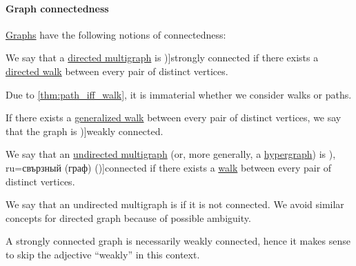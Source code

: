 \paragraph{Graph connectedness}

\begin{definition}\label{def:graph_connectedness}
  \hyperref[rem:graph_of_unspecified_type]{Graphs} have the following notions of connectedness:
  \begin{thmenum}
     We say that a \hyperref[def:directed_multigraph]{directed multigraph} is \term[ru=сильно связаный (граф) (\cite[def. 5.2]{БелоусовТкачёв2004ДискретнаяМатематика})]{strongly connected} if there exists a \hyperref[def:graph_walk/directed]{directed walk} between every pair of distinct vertices.

    Due to \cref{thm:path_iff_walk}, it is immaterial whether we consider walks or paths.

     If there exists a \hyperref[def:graph_walk/generalized]{generalized walk} between every pair of distinct vertices, we say that the graph is \term[ru=слабо связный (граф) (\cite[def. 5.4]{БелоусовТкачёв2004ДискретнаяМатематика})]{weakly connected}.

     We say that an \hyperref[def:hypergraph/multigraph]{undirected multigraph} (or, more generally, a \hyperref[def:hypergraph]{hypergraph}) is \term[bg=свързан (граф) (\cite[13]{Мирчев2001Графи}), ru=свързный (граф) (\cite[285]{БелоусовТкачёв2004ДискретнаяМатематика})]{connected} if there exists a \hyperref[def:graph_walk/undirected]{walk} between every pair of distinct vertices.

    We say that an undirected multigraph is  if it is not connected. We avoid similar concepts for directed graph because of possible ambiguity.
  \end{thmenum}
\end{definition}
\begin{comments}
  \item A strongly connected graph is necessarily weakly connected, hence it makes sense to skip the adjective \enquote{weakly} in this context.
\end{comments}

